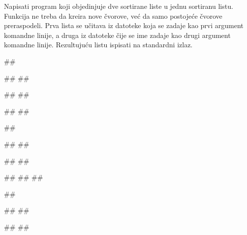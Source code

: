 \begin{Exercise}[label=609]
Napisati program koji objedinjuje dve sortirane liste u jednu sortiranu listu. Funkcija ne treba da 
kreira nove čvorove, već da samo
postojeće čvorove preraspodeli. Prva lista se učitava iz datoteke koja se 
zadaje kao prvi argument komandne
linije, a druga iz datoteke čije se ime zadaje kao drugi argument komandne linije. Rezultujuću listu ispisati na standardni izlaz.

\noindent
\begin{miditest}
\begin{test}{1}
##

##
##

##
##

#\naslovIzlaz#
##
\end{test}
\end{miditest}
\begin{miditest}
\begin{test}{2}
##

##
##

##
##

#\naslovIzlaz#
##
##
\end{test}
\end{miditest}
\begin{miditest}
\begin{test}{3}
##

##
##

##
##


\end{test}
\end{miditest}
\end{Exercise}
